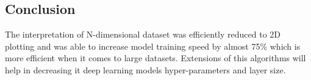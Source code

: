 \documentclass[11pt, a4paper]{article}
\begin{document}
\begin{multicols}{2}
    \section{Conclusion}
    The interpretation of N-dimensional dataset was efficiently reduced to 2D plotting and was able to increase model training speed by almost 75\% which is more efficient when it comes to large datasets. Extensions of this algorithms will help in decreasing it deep learning models hyper-parameters and layer size.
\end{multicols}
    \newpage
    \printbibliography
\end{document}
